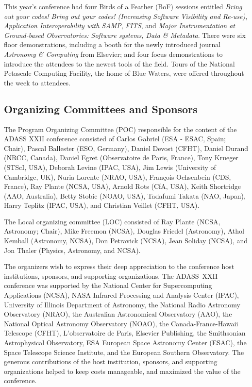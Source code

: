 This year's conference had four Birds of a Feather (BoF) sessions entitled \textit{Bring out your codes! Bring out your codes! (Increasing Software Visibility and Re-use)}, \textit{Application Interoperability with SAMP}, \textit{FITS}, and \textit{Major Instrumentation at Ground-based Observatories: Software systems, Data \& Metadata}. There were six floor demonstrations, including a booth for the newly introduced journal \textit{Astronomy \& Computing} from Elsevier; and four focus demonstrations to introduce the attendees to the newest tools of the field. Tours of the National Petascale Computing Facility, the home of Blue Waters, were offered throughout the week to attendees.

\subsection{Organizing Committees and Sponsors}

The Program Organizing Committee (POC) responsible for the content of the ADASS XXII conference consisted of Carlos Gabriel (ESA - ESAC, Spain; Chair), Pascal Ballester (ESO, Germany), Daniel Devost (CFHT), Daniel Durand (NRCC, Canada), Daniel Egret (Observatoire de Paris, France), Tony Krueger (STScI, USA), Deborah Levine (IPAC, USA), Jim Lewis (University of Cambridge, UK), Nuria Lorente (NRAO, USA), François Ochsenbein (CDS, France), Ray Plante (NCSA, USA), Arnold Rots (CfA, USA), Keith Shortridge (AAO, Australia), Betty Stobie (NOAO, USA), Tadafumi Takata (NAO, Japan), Harry Teplitz (IPAC, USA), and Christian Veillet (CFHT, USA).

The Local organizing committee (LOC) consisted of Ray Plante (NCSA, Astronomy; Chair), Mike Freemon (NCSA), Douglas Friedel (Astronomy), Athol Kemball (Astronomy, NCSA), Don Petravick (NCSA), Jean Soliday (NCSA), and Jon Thaler (Physics, Astronomy, and NCSA).
    
The organizers wish to express their deep appreciation to the conference host institutions, sponsors, and supporting organizations. The ADASS~XXII conference was supported by the National Center for Supercomputing Applications (NCSA), NASA Infrared Processing and Analysis Center (IPAC), University of Illinois Department of Astronomy, the National Radio Astronomy Observatory (NRAO), the Australian Astronomical Observatory (AAO), the National Optical Astronomy Observatory (NOAO), the Canada-France-Hawaii Telescope (CFHT), L'observatoire de Paris, Elsevier Publishing, the Smithsonian Astrophysical Observatory, ESA European Space Astronomy Center (ESAC), the Space Telescope Science Institute, and the European Southern Observatory. The generous contributions of the host institution, sponsors, and supporting organizations helped to keep costs manageable, and maximized the value of the conference.

